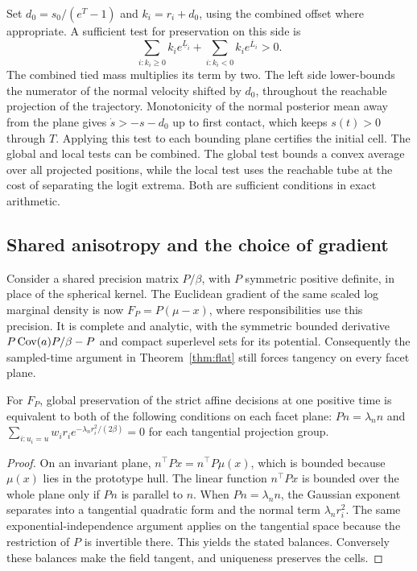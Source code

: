 Set $d_0=s_0/(e^T-1)$ and $k_i=r_i+d_0$, using the combined offset
where appropriate. A sufficient test for preservation on this side is
\begin{equation}
 \sum_{i:k_i\ge0} k_i e^{\underline L_i}
 +\sum_{i:k_i<0} k_i e^{\overline L_i}>0 .
 \label{eq:local-plane}
\end{equation}
The combined tied mass multiplies its term by two.
The left side lower-bounds the numerator of the normal velocity shifted
by $d_0$, throughout the reachable projection of the trajectory.
Monotonicity of the normal posterior mean away from the plane gives
$\dot s>-s-d_0$ up to first contact, which keeps $s(t)>0$ through $T$.
Applying this test to each bounding plane certifies the initial cell.
The global and local tests can be combined. The global test bounds a
convex average over all projected positions, while the local test
uses the reachable tube at the cost of separating the logit extrema.
Both are sufficient conditions in exact arithmetic.

\subsection{Shared anisotropy and the choice of gradient}
\label{sec:anisotropy}
Consider a shared precision matrix $P/\beta$, with $P$ symmetric
positive definite, in place of the spherical kernel. The Euclidean
gradient of the same scaled log marginal density is now
$F_P=P(\mu-x)$, where responsibilities use this precision. It is
complete and analytic, with the symmetric bounded derivative
$P\operatorname{Cov}(a)P/\beta-P$ and compact superlevel sets for its potential.
Consequently the sampled-time argument in Theorem~\ref{thm:flat}
still forces tangency on every facet plane.

\begin{corollary}
\label{cor:anisotropy}
For $F_P$, global preservation of the strict affine decisions at
one positive time is equivalent to both of the following conditions on
each facet plane: $Pn=\lambda_n n$ and
$\sum_{i:u_i=u}w_i r_i e^{-\lambda_n r_i^2/(2\beta)}=0$ for each
tangential projection group.
\end{corollary}

\begin{proof}
On an invariant plane, $n^\top P x=n^\top P\mu(x)$, which is bounded
because $\mu(x)$ lies in the prototype hull. The linear function
$n^\top P x$ is bounded over the whole plane only if $Pn$ is parallel
to $n$. When $Pn=\lambda_n n$, the Gaussian exponent separates
into a tangential quadratic form and the normal term
$\lambda_n r_i^2$. The same exponential-independence argument
applies on the tangential space because the restriction of $P$ is
invertible there. This yields the stated balances. Conversely these
balances make the field tangent, and uniqueness preserves the cells.
\end{proof}

